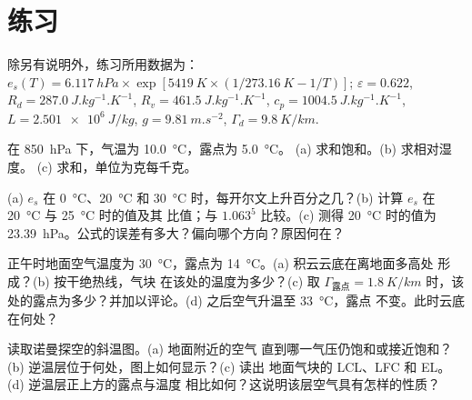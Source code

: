 \section*{练习}\label{sec:b2:atmospheric-thermodynamics:exercises}

除另有说明外，练习所用数据为：$e_s(T) = \qty{6.117}{hPa} \times
\exp[\qty{5419}{K} \times (1/\qty{273.16}{K} - 1/T)]$; $\varepsilon = 0.622$, $R_d =
\qty{287.0}{J.kg^{-1}.K^{-1}}$, $R_v = \qty{461.5}{J.kg^{-1}.K^{-1}}$, $c_p =
\qty{1004.5}{J.kg^{-1}.K^{-1}}$, $L = \qty{2.501e6}{J/kg}$, $g = \qty{9.81}{m.s^{-2}}$,
$\Gamma_d = \qty{9.8}{K/km}$.

\begin{exercise}[$\star$]\label{exo:b2:atmospheric-thermodynamics:1}
在 \qty{850}{hPa} 下，气温为 \qty{10.0}{\celsius}，露点为 \qty{5.0}{\celsius}。
(a) 求和饱和。(b) 求相对湿度。
(c) 求和，单位为克每千克。
\end{exercise}

\begin{exercise}[$\star$]\label{exo:b2:atmospheric-thermodynamics:2}
(a) $e_s$ 在 \qty{0}{\celsius}、\qty{20}{\celsius} 和
\qty{30}{\celsius} 时，每开尔文上升百分之几？(b) 计算 $e_s$ 在 \qty{20}{\celsius} 与 \qty{25}{\celsius} 时的值及其
比值；与 $1.063^5$ 比较。(c) 测得 \qty{20}{\celsius} 时的值为
\qty{23.39}{hPa}。公式的误差有多大？偏向哪个方向？原因何在？
\end{exercise}

\begin{exercise}[$\star$]\label{exo:b2:atmospheric-thermodynamics:3}
正午时地面空气温度为 \qty{30}{\celsius}，露点为 \qty{14}{\celsius}。(a) 积云云底在离地面多高处
形成？(b) 按干绝热线，气块
在该处的温度为多少？(c) 取 $\Gamma_{\text{露点}} =
\qty{1.8}{K/km}$ 时，该处的露点为多少？并加以评论。(d) 之后空气升温至 \qty{33}{\celsius}，露点
不变。此时云底在何处？
\end{exercise}

\begin{exercise}[$\star$]\label{exo:b2:atmospheric-thermodynamics:4}
读取诺曼探空的斜温图。(a) 地面附近的空气
直到哪一气压仍饱和或接近饱和？(b) 逆温层位于何处，图上如何显示？(c) 读出
地面气块的 LCL、LFC 和 EL。(d) 逆温层正上方的露点与温度
相比如何？这说明该层空气具有怎样的性质？
\end{exercise}


